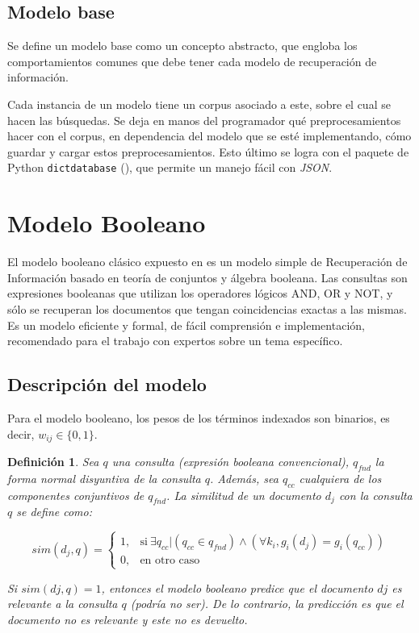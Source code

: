 \documentclass{llncs}
\newtheorem{defn}[theorem]{Definici\'on}
\begin{document}
	\subsection{Modelo base}
	
	Se define un modelo base como un concepto abstracto, que engloba los comportamientos comunes que debe tener cada modelo de recuperaci\'on de informaci\'on. 
	
	Cada instancia de un modelo tiene un corpus asociado a este, sobre el cual se hacen las b\'usquedas. Se deja en manos del programador qu\'e preprocesamientos hacer con el corpus, en dependencia del modelo que se est\'e implementando, cómo guardar y cargar estos preprocesamientos. Esto último se logra con el paquete de Python \texttt{dictdatabase} (\cite{B7}), que permite un manejo fácil con \textit{JSON}.
	
	\section{Modelo Booleano}
	
	El modelo booleano cl\'asico expuesto en \cite[Secci\'on 2.2.5]{B2} es un modelo simple de Recuperaci\'on de Informaci\'on basado en teor\'ia de conjuntos y \'algebra booleana. Las consultas son expresiones booleanas que utilizan los operadores l\'ogicos AND, OR y NOT, y s\'olo se recuperan los documentos que tengan coincidencias exactas a las mismas. Es un modelo eficiente y formal, de f\'acil comprensi\'on e implementaci\'on, recomendado para el trabajo con expertos sobre un tema espec\'ifico.
	
	\subsection{Descripci\'on del modelo}
	
	Para el modelo booleano, los pesos de los t\'erminos indexados son binarios, es decir, $ w_{ij} \in \{0,1\} $.
	
	\begin{defn}
		\cite{B2}
		Sea $ q $ una consulta (expresi\'on booleana convencional), $ q_{fnd} $ la forma normal disyuntiva de la consulta $ q $. Además, sea $ q_{cc} $ cualquiera de los componentes conjuntivos de $ q_{fnd} $. La similitud de un documento $ d_{j} $ con la consulta $ q $ se define como:
		
		\begin{equation}
			sim(d_{j}, q)=
			\begin{cases}
				1, & \text{si}\ \exists  q_{cc} | (q_{cc} \in q_{fnd}) \wedge (\forall k_{i}, g_{i}(d_{j}) = g_{i}(q_{cc})) \\
				0, & \text{en otro caso}
			\end{cases}
		\end{equation}
		
		Si $ sim(dj, q) = 1 $, entonces el modelo booleano predice que el documento $ dj $ es relevante a la consulta $ q $ (podría no ser). De lo contrario, la predicción es que el documento no es relevante y este no es devuelto.
	\end{defn}
	
\end{document}
